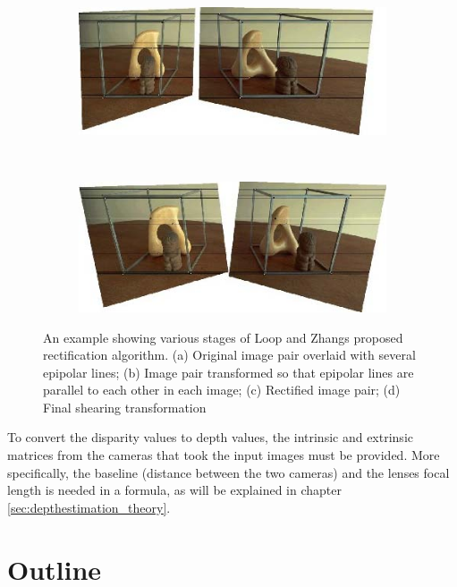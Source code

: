 \begin{figure}
  \begin{subfigure}[b]{0.48\textwidth}
    \centering
    \includegraphics[width=\textwidth]{images/rectification-example-3.png}
    \caption{}
  \end{subfigure}
  ~
  \begin{subfigure}[b]{0.48\textwidth}
    \centering
    \includegraphics[width=\textwidth]{images/rectification-example-4.png}
    \caption{}
  \end{subfigure}

  \caption{An example showing various stages of Loop and
    Zhangs\cite{loop-zhang} proposed rectification algorithm. (a)
    Original image pair overlaid with several epipolar lines; (b)
    Image pair transformed so that epipolar lines are parallel to each
    other in each image; (c) Rectified image pair; (d) Final shearing
    transformation}

\end{figure}

To convert the disparity values to depth values, the intrinsic and
extrinsic matrices from the cameras that took the input images must be
provided. More specifically, the baseline (distance between the two
cameras) and the lenses focal length is needed in a formula, as will
be explained in chapter \ref{sec:depthestimation_theory}.

\section{Outline}


